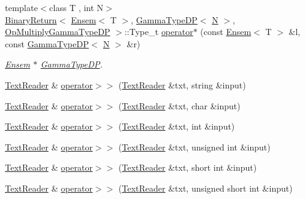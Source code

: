 \begin{DoxyCompactItemize}
{\footnotesize template$<$class T , int N$>$ }\\\mbox{\hyperlink{structENSEM_1_1BinaryReturn}{Binary\+Return}}$<$ \mbox{\hyperlink{classENSEM_1_1Ensem}{Ensem}}$<$ T $>$, \mbox{\hyperlink{classENSEM_1_1GammaTypeDP}{Gamma\+Type\+DP}}$<$ \mbox{\hyperlink{operator__name__util_8cc_a7722c8ecbb62d99aee7ce68b1752f337}{N}} $>$, \mbox{\hyperlink{structENSEM_1_1OpMultiplyGammaTypeDP}{Op\+Multiply\+Gamma\+Type\+DP}} $>$\+::Type\+\_\+t \mbox{\hyperlink{group__eensem_ga28d880d590e554a96424952e16186000}{operator$\ast$}} (const \mbox{\hyperlink{classENSEM_1_1Ensem}{Ensem}}$<$ T $>$ \&l, const \mbox{\hyperlink{classENSEM_1_1GammaTypeDP}{Gamma\+Type\+DP}}$<$ \mbox{\hyperlink{operator__name__util_8cc_a7722c8ecbb62d99aee7ce68b1752f337}{N}} $>$ \&r)
\begin{DoxyCompactList}\small\item\em \mbox{\hyperlink{classENSEM_1_1Ensem}{Ensem}} $\ast$ \mbox{\hyperlink{classENSEM_1_1GammaTypeDP}{Gamma\+Type\+DP}}. \end{DoxyCompactList}\item 
\mbox{\hyperlink{classENSEM_1_1TextReader}{Text\+Reader}} \& \mbox{\hyperlink{namespaceENSEM_aa252c4dc795051b8bd8067eda747daa6}{operator$>$$>$}} (\mbox{\hyperlink{classENSEM_1_1TextReader}{Text\+Reader}} \&txt, string \&input)
\item 
\mbox{\hyperlink{classENSEM_1_1TextReader}{Text\+Reader}} \& \mbox{\hyperlink{group__io_ga4eecbfcd47e20672ad52ed41560f8573}{operator$>$$>$}} (\mbox{\hyperlink{classENSEM_1_1TextReader}{Text\+Reader}} \&txt, char \&input)
\item 
\mbox{\hyperlink{classENSEM_1_1TextReader}{Text\+Reader}} \& \mbox{\hyperlink{group__io_gab07a2169d63109c0bd1ec46e750bed16}{operator$>$$>$}} (\mbox{\hyperlink{classENSEM_1_1TextReader}{Text\+Reader}} \&txt, int \&input)
\item 
\mbox{\hyperlink{classENSEM_1_1TextReader}{Text\+Reader}} \& \mbox{\hyperlink{group__io_gac2f3c9587dbdd787bd2dfe5023813c67}{operator$>$$>$}} (\mbox{\hyperlink{classENSEM_1_1TextReader}{Text\+Reader}} \&txt, unsigned int \&input)
\item 
\mbox{\hyperlink{classENSEM_1_1TextReader}{Text\+Reader}} \& \mbox{\hyperlink{group__io_gad9337602901bc89db928ac4dc262e96f}{operator$>$$>$}} (\mbox{\hyperlink{classENSEM_1_1TextReader}{Text\+Reader}} \&txt, short int \&input)
\item 
\mbox{\hyperlink{classENSEM_1_1TextReader}{Text\+Reader}} \& \mbox{\hyperlink{group__io_ga371e4c7d2636c108da9fd5217e1532ce}{operator$>$$>$}} (\mbox{\hyperlink{classENSEM_1_1TextReader}{Text\+Reader}} \&txt, unsigned short int \&input)

\end{DoxyCompactItemize}
